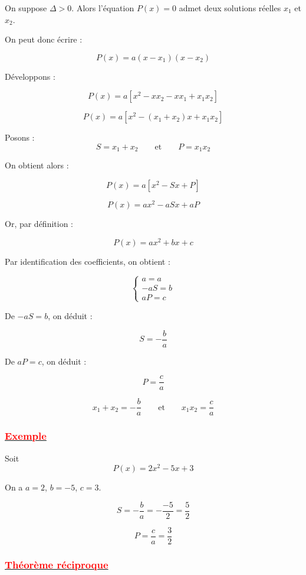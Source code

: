 \documentclass[12pt,a4paper]{article}
\newcounter{solution}
\begin{document}
On suppose $\Delta > 0$.  
Alors l’équation $P(x)=0$ admet deux solutions réelles $x_1$ et $x_2$.

On peut donc écrire :

\[
P(x) = a(x - x_1)(x - x_2)
\]

Développons :

\[
P(x) = a \left[ x^2 - x x_2 - x x_1 + x_1 x_2 \right]
\]

\[
P(x) = a \left[ x^2 - (x_1 + x_2)x + x_1 x_2 \right]
\]

Posons :
\[
S = x_1 + x_2
\qquad \text{et} \qquad
P = x_1 x_2
\]

On obtient alors :

\[
P(x) = a \left[ x^2 - Sx + P \right]
\]

\[
P(x) = ax^2 - aSx + aP
\]

Or, par définition :

\[
P(x) = ax^2 + bx + c
\]

\bigskip

Par identification des coefficients, on obtient :

\[
\begin{cases}
a = a \\
-aS = b \\
aP = c
\end{cases}
\]

\bigskip

De $-aS = b$, on déduit :

\[
S = -\frac{b}{a}
\]

De $aP = c$, on déduit :

\[
P = \frac{c}{a}
\]

\bigskip

\[
\boxed{
x_1 + x_2 = -\frac{b}{a}
\qquad \text{et} \qquad
x_1 x_2 = \frac{c}{a}
}
\]
\subsubsection*{\underline{\textcolor{red}{Exemple}}}

Soit 
\[
P(x) = 2x^2 - 5x + 3
\]

On a $a=2$, $b=-5$, $c=3$.

\[
S = -\frac{b}{a} = -\frac{-5}{2} = \frac{5}{2}
\]

\[
P = \frac{c}{a} = \frac{3}{2}
\]

\bigskip

\subsubsection*{\underline{\textcolor{red}{Théorème réciproque}}}
\end{document}
